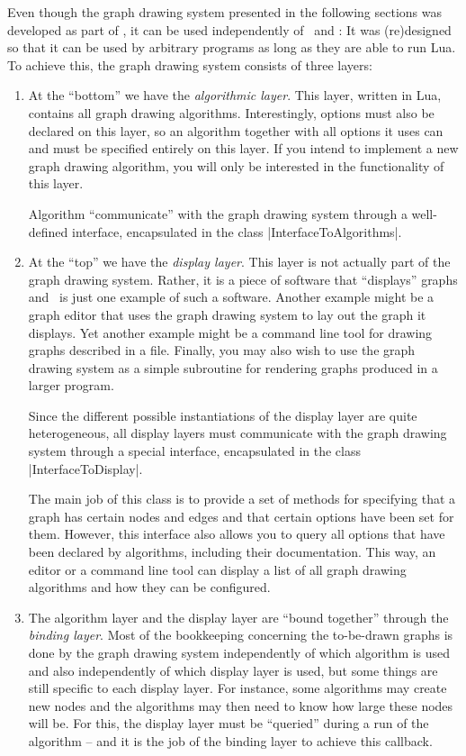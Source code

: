 Even though the graph drawing system presented in the following sections was
developed as part of \pgfname, it can be used independently of \pgfname\ and
\tikzname: It was (re)designed so that it can be used by arbitrary programs as
long as they are able to run Lua. To achieve this, the graph drawing system
consists of three layers:
%
\begin{enumerate}
    \item At the ``bottom'' we have the \emph{algorithmic layer}. This layer,
        written in Lua, contains all graph drawing algorithms. Interestingly,
        options must also be declared on this layer, so an algorithm together
        with all options it uses can and must be specified entirely on this
        layer. If you intend to implement a new graph drawing algorithm, you
        will only be interested in the functionality of this layer.

        Algorithm ``communicate'' with the graph drawing system through a
        well-defined interface, encapsulated in the class
        |InterfaceToAlgorithms|.
    \item At the ``top'' we have the \emph{display layer}. This layer is not
        actually part of the graph drawing system. Rather, it is a piece of
        software that ``displays'' graphs and \tikzname\ is just one example of
        such a software. Another example might be a graph editor that uses the
        graph drawing system to lay out the graph it displays. Yet another
        example might be a command line tool for drawing graphs described in a
        file. Finally, you may also wish to use the graph drawing system as a
        simple subroutine for rendering graphs produced in a larger program.

        Since the different possible instantiations of the display layer are
        quite heterogeneous, all display layers must communicate with the graph
        drawing system through a special interface, encapsulated in the class
        |InterfaceToDisplay|.

        The main job of this class is to provide a set of methods for
        specifying that a graph has certain nodes and edges and that certain
        options have been set for them. However, this interface also allows you
        to query all options that have been declared by algorithms, including
        their documentation. This way, an editor or a command line tool can
        display a list of all graph drawing algorithms and how they can be
        configured.
    \item The algorithm layer and the display layer are ``bound together''
        through the \emph{binding layer}. Most of the bookkeeping concerning
        the to-be-drawn graphs is done by the graph drawing system
        independently of which algorithm is used and also independently of
        which display layer is used, but some things are still specific to each
        display layer. For instance, some algorithms may create new nodes and
        the algorithms may then need to know how large these nodes will be. For
        this, the display layer must be ``queried'' during a run of the
        algorithm -- and it is the job of the binding layer to achieve this
        callback.


\end{enumerate}
